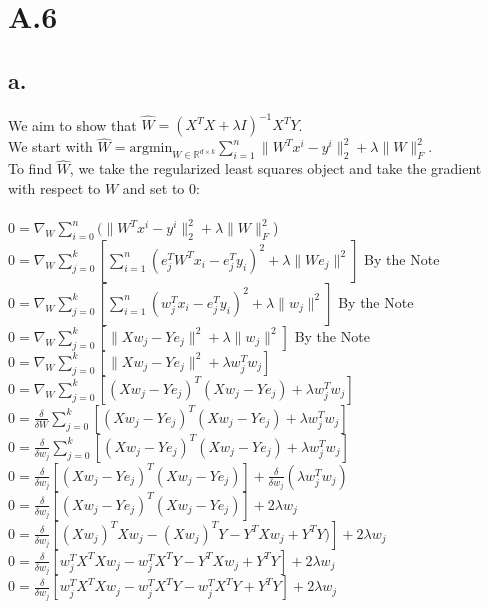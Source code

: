 \documentclass{article}
\newcommand{\field}[1]{\mathbb{#1}}
\newcommand{\1}{\mathbf{1}}
\newcommand{\R}{\field{R}} %
\begin{document}
\section*{A.6}
{\Large 

\subsection*{a.}

We aim to show that $\widehat{W} = (X^TX + \lambda I)^{-1}X^TY$. \\ 
We start with $\widehat{W} = \text{argmin}_{W \in \R^{d \times k}} \sum_{i=1}^{n} \| W^Tx^i - y^i \|_2^2 + \lambda \| W \|_F^2$. \\
To find $\widehat{W}$, we take the regularized least squares object and take the gradient with respect to $W$ and set to 0: \\ \\ 
$0 = \nabla_W \sum_{i=0}^{n} (\| W^Tx^i - y^i \|_2^2 + \lambda \| W \|_F^2$) \\
$0 = \nabla_W \sum_{j=0}^{k} [ \sum_{i=1}^{n} (e^T_j W^Tx_i - e^T_jy_i)^2 + \lambda \| We_j \|^2]$ \hfill By the Note \\
$0 = \nabla_W \sum_{j=0}^{k} [ \sum_{i=1}^{n} (w^T_j x_i - e^T_jy_i)^2 + \lambda \| w_j \|^2]$ \hfill By the Note \\
$0 = \nabla_W \sum_{j=0}^{k} [ \| Xw_j - Ye_j\|^2 + \lambda \| w_j \|^2]$ \hfill By the Note \\
$0 = \nabla_W \sum_{j=0}^{k} [ \| Xw_j - Ye_j\|^2 + \lambda  w_j^T w_j]$ \\
$0 = \nabla_W \sum_{j=0}^{k} [ (Xw_j - Ye_j)^T(Xw_j - Ye_j) + \lambda  w_j^T w_j]$ \\
$0 = \frac{\delta }{\delta W} \sum_{j=0}^{k} [ (Xw_j - Ye_j)^T(Xw_j - Ye_j) + \lambda  w_j^T w_j]$ \\
$0 = \frac{\delta }{\delta w_j} \sum_{j=0}^{k} [ (Xw_j - Ye_j)^T(Xw_j - Ye_j) + \lambda  w_j^T w_j]$ \\
$0 = \frac{\delta }{\delta w_j}[(Xw_j - Ye_j)^T(Xw_j - Ye_j)] + \frac{\delta }{\delta w_j} (\lambda  w_j^T w_j)$ \\
$0 = \frac{\delta }{\delta w_j}[(Xw_j - Ye_j)^T(Xw_j - Ye_j)] +  2\lambda w_j$ \\
$0 = \frac{\delta }{\delta w_j}[(Xw_j)^TXw_j - (Xw_j)^TY - Y^TXw_j + Y^TY)] +  2\lambda w_j$ \\
$0 = \frac{\delta }{\delta w_j}[w_j^TX^TXw_j - w_j^TX^TY - Y^TXw_j + Y^TY] +  2\lambda w_j$ \\
$0 = \frac{\delta }{\delta w_j}[w_j^TX^TXw_j - w_j^TX^TY - w_j^TX^TY + Y^TY] +  2\lambda w_j$ \\
}
\end{document}
